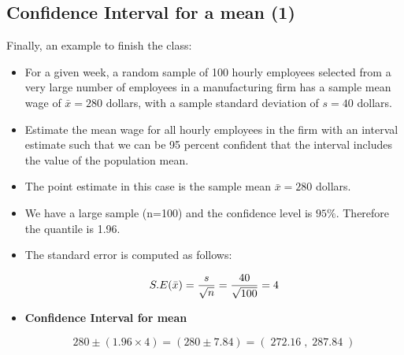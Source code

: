 \documentclass[a4paper,12pt]{article}
\begin{document}
\subsection{Confidence Interval for a mean (1) }
Finally, an example to finish the class:
\begin{itemize}
\item For a given week, a random sample of 100 hourly employees selected from a very large number of
employees in a manufacturing firm has a sample mean wage of $\bar{x} = 280$ dollars, with a sample standard deviation of
$s = 40$ dollars.
\item Estimate the mean wage for all hourly employees in the firm with an interval estimate such that we can be 95
percent confident that the interval includes the value of the population mean.
\end{itemize}



\begin{itemize}
\item The point estimate in this case is the sample mean $\bar{x} = 280$ dollars.
\item We have a large sample (n=100) and the confidence level is $95\%$. Therefore the quantile  is 1.96.
\item The standard error is computed as follows:

\[ S.E( \bar{x} )  = {s \over \sqrt{n}}  =  {40 \over \sqrt{100}} = 4  \]
\item \textbf{Confidence Interval for mean}

\[
280 \pm (1.96 \times 4)  = (280 \pm 7.84) = (\;272.16\;,\;287.84\;)
\]

\end{itemize}

 
\end{document}
